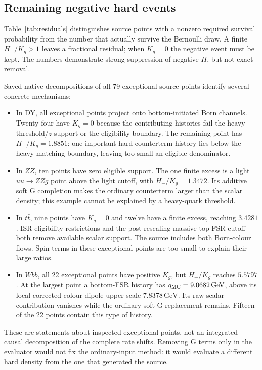 \documentclass[11pt,a4paper]{article}
\newcommand{\GeV}{\,\mathrm{GeV}}
\begin{document}
\subsection{Remaining negative hard events}
\label{sec:negativeh}

Table~\ref{tab:residuals} distinguishes source points with a nonzero
required survival probability from the number that actually survive
the Bernoulli draw. A finite $H_-/K_g>1$ leaves a fractional residual;
when $K_g=0$ the negative event must be kept. The numbers demonstrate
strong suppression of negative $H$, but not exact removal.

Saved native decompositions of all 79 exceptional source points
identify several concrete mechanisms:
\begin{itemize}
 \item In DY, all exceptional points project onto bottom-initiated
 Born channels. Twenty-four have $K_g=0$ because the contributing
 histories fail the heavy-threshold/$z$ support or the eligibility
 boundary. The remaining point has $H_-/K_g=1.8851$: one important
 hard-counterterm history lies below the heavy matching boundary,
 leaving too small an eligible denominator.
 \item In $ZZ$, ten points have zero eligible support. The one finite
 excess is a light $u\bar u\to ZZg$ point above the light cutoff,
 with $H_-/K_g=1.3472$. Its additive soft G completion makes the
 ordinary counterterm larger than the scalar density; this example
 cannot be explained by a heavy-quark threshold.
 \item In $t\bar t$, nine points have $K_g=0$ and twelve have a finite
 excess, reaching $3.4281$. ISR eligibility restrictions and the
 post-rescaling massive-top FSR cutoff both remove available scalar
 support. The source includes both Born-colour flows. Spin terms in
 these exceptional points are too small to explain their large
 ratios.
 \item In $Wb\bar b$, all 22 exceptional points have positive $K_g$,
 but $H_-/K_g$ reaches $5.5797$. At the largest point a bottom-FSR
 history has $q_{\rm MC}=9.0682\GeV$, above its local corrected
 colour-dipole upper scale $7.8378\GeV$. Its raw scalar contribution
 vanishes while the ordinary soft G replacement remains. Fifteen
 of the 22 points contain this type of history.
\end{itemize}
These are statements about inspected exceptional points, not an
integrated causal decomposition of the complete rate shifts. Removing
G terms only in the evaluator would not fix the ordinary-input method:
it would evaluate a different hard density from the one that generated
the source.
\end{document}
